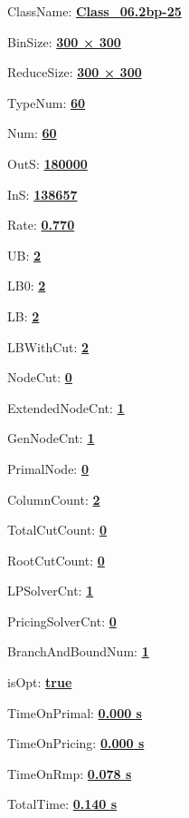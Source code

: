 \documentclass[11pt]{article}
\begin{document}
\pagestyle{empty}


ClassName: \underline{\textbf{Class_06.2bp-25}}
\par
BinSize: \underline{\textbf{300 × 300}}
\par
ReduceSize: \underline{\textbf{300 × 300}}
\par
TypeNum: \underline{\textbf{60}}
\par
Num: \underline{\textbf{60}}
\par
OutS: \underline{\textbf{180000}}
\par
InS: \underline{\textbf{138657}}
\par
Rate: \underline{\textbf{0.770}}
\par
UB: \underline{\textbf{2}}
\par
LB0: \underline{\textbf{2}}
\par
LB: \underline{\textbf{2}}
\par
LBWithCut: \underline{\textbf{2}}
\par
NodeCut: \underline{\textbf{0}}
\par
ExtendedNodeCnt: \underline{\textbf{1}}
\par
GenNodeCnt: \underline{\textbf{1}}
\par
PrimalNode: \underline{\textbf{0}}
\par
ColumnCount: \underline{\textbf{2}}
\par
TotalCutCount: \underline{\textbf{0}}
\par
RootCutCount: \underline{\textbf{0}}
\par
LPSolverCnt: \underline{\textbf{1}}
\par
PricingSolverCnt: \underline{\textbf{0}}
\par
BranchAndBoundNum: \underline{\textbf{1}}
\par
isOpt: \underline{\textbf{true}}
\par
TimeOnPrimal: \underline{\textbf{0.000 s}}
\par
TimeOnPricing: \underline{\textbf{0.000 s}}
\par
TimeOnRmp: \underline{\textbf{0.078 s}}
\par
TotalTime: \underline{\textbf{0.140 s}}
\par
\newpage
\end{document}

